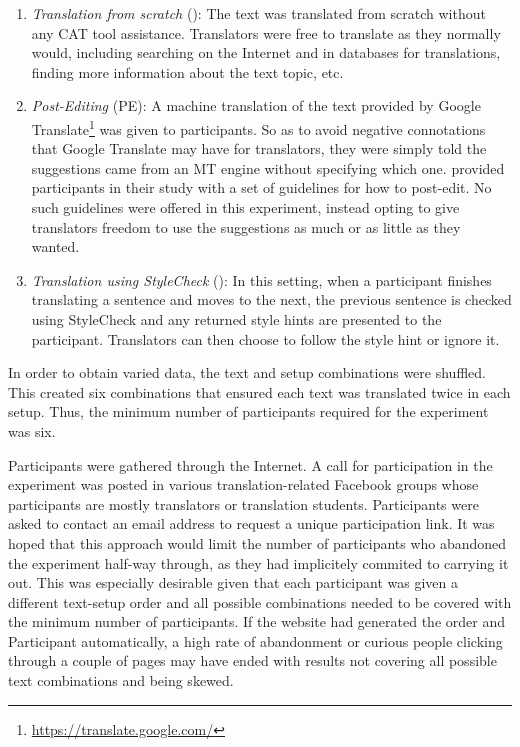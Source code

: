 \begin{enumerate}
    \item \textit{Translation from scratch} (): The text was translated from scratch without any \ac{CAT} tool assistance. Translators were free to translate as they normally would, including searching on the Internet and in databases for translations, finding more information about the text topic, etc.
    \item \textit{Post-Editing} (\ac{PE}): A machine translation of the text provided by Google Translate\footnote{\url{https://translate.google.com/}} was given to participants. So as to avoid negative connotations that Google Translate may have for translators, they were simply told the suggestions came from an \ac{MT} engine without specifying which one. \textcite{carl2015post} provided participants in their study with a set of guidelines for how to post-edit. No such guidelines were offered in this experiment, instead opting to give translators freedom to use the suggestions as much or as little as they wanted.
    \item \textit{Translation using StyleCheck} (): In this setting, when a participant finishes translating a sentence and moves to the next, the previous sentence is checked using StyleCheck and any returned style hints are presented to the participant. Translators can then choose to follow the style hint or ignore it.
\end{enumerate}

In order to obtain varied data, the text and setup combinations were shuffled. This created six combinations that ensured each text was translated twice in each setup. Thus, the minimum number of participants required for the experiment was six.

Participants were gathered through the Internet. A call for participation in the experiment was posted in various translation-related Facebook groups whose participants are mostly translators or translation students. Participants were asked to contact an email address to request a unique participation link. It was hoped that this approach would limit the number of participants who abandoned the experiment half-way through, as they had implicitely commited to carrying it out. This was especially desirable given that each participant was given a different text-setup order and all possible combinations needed to be covered with the minimum number of participants. If the website had generated the order and Participant  automatically, a high rate of abandonment or curious people clicking through a couple of pages may have ended with results not covering all possible text combinations and being skewed.

